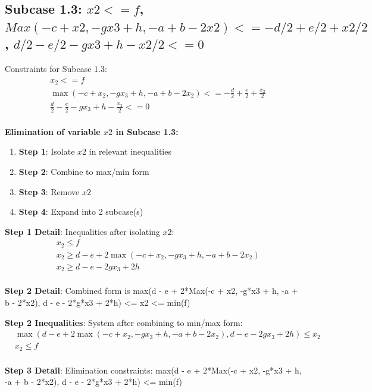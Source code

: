 \documentclass{article}
\begin{document}
\subsection{Subcase 1.3: $x2 <= f$, $Max(-c + x2, -g x3 + h, -a + b - 2 x2) <= -d/2 + e/2 + x2/2$, $d/2 - e/2 - g x3 + h - x2/2 <= 0$}

Constraints for Subcase 1.3:
\begin{align}
& x_{2} <= f \\
& \max\left(- c + x_{2}, - g x_{3} + h, - a + b - 2 x_{2}\right) <= - \frac{d}{2} + \frac{e}{2} + \frac{x_{2}}{2} \\
& \frac{d}{2} - \frac{e}{2} - g x_{3} + h - \frac{x_{2}}{2} <= 0 \\
\end{align}

\textbf{Elimination of variable $x2$ in Subcase 1.3:}

\begin{enumerate}
\item \textbf{Step 1}: Isolate $x2$ in relevant inequalities
\item \textbf{Step 2}: Combine to max/min form
\item \textbf{Step 3}: Remove $x2$
\item \textbf{Step 4}: Expand into 2 subcase(s)
\end{enumerate}

\textbf{Step 1 Detail}: Inequalities after isolating $x2$:
\begin{align}
& x_{2} \leq f \\
& x_{2} \geq d - e + 2 \max\left(- c + x_{2}, - g x_{3} + h, - a + b - 2 x_{2}\right) \\
& x_{2} \geq d - e - 2 g x_{3} + 2 h \\
\end{align}

\textbf{Step 2 Detail}: Combined form is max(d - e + 2*Max(-c + x2, -g*x3 + h, -a + b - 2*x2), d - e - 2*g*x3 + 2*h) <= x2 <= min(f)

\textbf{Step 2 Inequalities}: System after combining to min/max form:
\begin{align}
& \max\left(d - e + 2 \max\left(- c + x_{2}, - g x_{3} + h, - a + b - 2 x_{2}\right), d - e - 2 g x_{3} + 2 h\right) \leq x_{2} \\
& x_{2} \leq f \\
\end{align}

\textbf{Step 3 Detail}: Elimination constraints:
\quad max(d - e + 2*Max(-c + x2, -g*x3 + h, -a + b - 2*x2), d - e - 2*g*x3 + 2*h) <= min(f)
\end{document}
